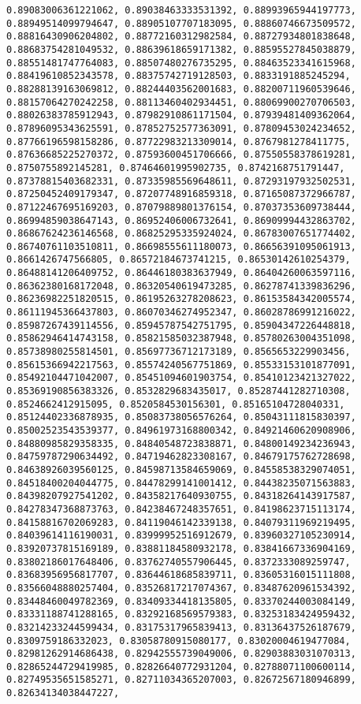 \documentclass[11pt]{article}
\begin{document}
\begin{Verbatim}[commandchars=\\\{\}]
0.89083006361221062, 0.89038463333531392, 0.88993965944197773, 0.88949514099794647, 0.88905107707183095, 0.88860746673509572, 0.88816430906204802, 0.88772160312982584, 0.88727934801838648, 0.88683754281049532, 0.88639618659171382, 0.88595527845038879, 0.88551481747764083, 0.88507480276735295, 0.88463523341615968, 0.88419610852343578, 0.88375742719128503, 0.8833191885245294, 0.88288139163069812, 0.88244403562001683, 0.88200711960539646, 0.88157064270242258, 0.88113460402934451, 0.88069900270706503, 0.88026383785912943, 0.87982910861171504, 0.87939481409362064, 0.87896095343625591, 0.87852752577363091, 0.87809453024234652, 0.87766196598158286, 0.87722983213309014, 0.8767981278411775, 0.87636685225270372, 0.87593600451706666, 0.87550558378619281, 0.8750755892145281, 0.87464601995902735, 0.8742168751791447, 0.87378815403682331, 0.87335985569648611, 0.87293197932502531, 0.87250452409179347, 0.87207748916859318, 0.87165087372966787, 0.87122467695169203, 0.87079889801376154, 0.87037353609738444, 0.86994859038647143, 0.86952406006732641, 0.86909994432863702, 0.86867624236146568, 0.86825295335924024, 0.86783007651774402, 0.86740761103510811, 0.86698555611180073, 0.86656391095061913, 0.8661426747566805, 0.86572184673741215, 0.86530142610254379, 0.86488141206409752, 0.86446180383637949, 0.86404260063597116, 0.86362380168172048, 0.86320540619473285, 0.86278741339836296, 0.86236982251820515, 0.86195263278208623, 0.86153584342005574, 0.86111945366437803, 0.86070346274952347, 0.86028786991216022, 0.85987267439114556, 0.85945787542751795, 0.85904347226448818, 0.85862946414743158, 0.85821585032387948, 0.85780263004351098, 0.85738980255814501, 0.85697736712173189, 0.8565653229903456, 0.85615366942217563, 0.85574240567751869, 0.85533153101877091, 0.85492104471042007, 0.85451094601903754, 0.85410123421327022, 0.85369190856383326, 0.8532829683435017, 0.85287441282710308, 0.8524662412915095, 0.8520584530156301, 0.85165104728040331, 0.85124402336878935, 0.85083738056576264, 0.85043111815830397, 0.85002523543539377, 0.84961973168800342, 0.84921460620908906, 0.84880985829358335, 0.84840548723838871, 0.84800149234236943, 0.84759787290634492, 0.84719462823308167, 0.84679175762728698, 0.84638926039560125, 0.84598713584659069, 0.84558538329074051, 0.84518400204044775, 0.84478299141001412, 0.84438235071563883, 0.84398207927541202, 0.84358217640930755, 0.84318264143917587, 0.84278347368873763, 0.84238467248357651, 0.84198623715113174, 0.84158816702069283, 0.84119046142339138, 0.84079311969219495, 0.84039614116190031, 0.83999952516912679, 0.83960327105230914, 0.83920737815169189, 0.83881184580932178, 0.83841667336904169, 0.83802186017648406, 0.83762740557906445, 0.8372333089259747, 0.83683956956817707, 0.83644618685839711, 0.83605316015111808, 0.83566048880257404, 0.83526817217074367, 0.83487620961534392, 0.83448460049782369, 0.83409334418135805, 0.83370244003084149, 0.83331188741288165, 0.83292168569579383, 0.83253183424959432, 0.83214233244599434, 0.83175317965839413, 0.83136437526187679, 0.8309759186332023, 0.83058780915080177, 0.83020004619477084, 0.82981262914686438, 0.82942555739049006, 0.82903883031070313, 0.82865244729419985, 0.82826640772931204, 0.82788071100600114, 0.82749535651585271, 0.82711034365207003, 0.82672567180946899, 0.82634134038447227, 
\end{Verbatim}
\end{document}
